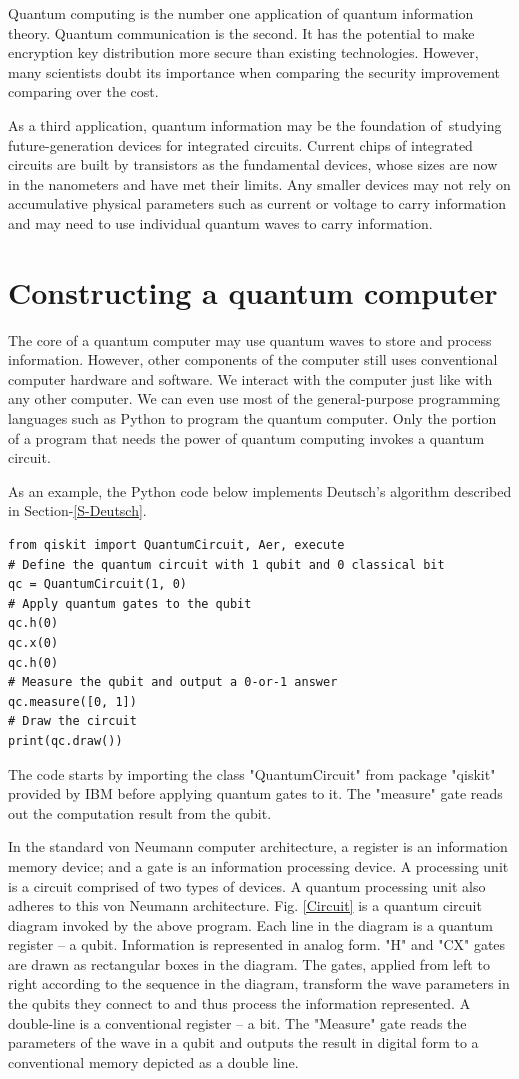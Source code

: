 \documentclass[oneside, letter, 12pt]{book}
\begin{document}
Quantum computing is the number one application of quantum information theory. Quantum communication is the second. It has the potential to make encryption key distribution more secure than existing technologies. However, many scientists doubt its importance when comparing the security improvement comparing over the cost.

As a third application, quantum information may be the foundation of studying future-generation devices for integrated circuits. Current chips of integrated circuits are built by transistors as the fundamental devices, whose sizes are now in the nanometers and have met their limits. Any smaller devices may not rely on accumulative physical parameters such as current or voltage to carry information and may need to use individual quantum waves to carry information.

\section{Constructing a quantum computer}
The core of a quantum computer may use quantum waves to store and process information. However, other components of the computer still uses conventional computer hardware and software. We interact with the computer just like with any other computer. We can even use most of the general-purpose programming languages such as Python to program the quantum computer. Only the portion of a program that needs the power of quantum computing invokes a quantum circuit.

As an example, the Python code below implements Deutsch's algorithm described in Section-\ref{S-Deutsch}.
\begin{lstlisting}
from qiskit import QuantumCircuit, Aer, execute
# Define the quantum circuit with 1 qubit and 0 classical bit
qc = QuantumCircuit(1, 0)
# Apply quantum gates to the qubit
qc.h(0)
qc.x(0)
qc.h(0)
# Measure the qubit and output a 0-or-1 answer
qc.measure([0, 1])
# Draw the circuit
print(qc.draw())
\end{lstlisting}
The code starts by importing the class "QuantumCircuit" from package "qiskit" provided by IBM before applying quantum gates to it. The "measure" gate reads out the computation result from the qubit. 

In the standard von Neumann computer architecture, a register is an information memory device; and a gate is an information processing device. A processing unit is a circuit comprised of two types of devices. A quantum processing unit also adheres to this von Neumann architecture. Fig. \ref{Circuit} is a quantum circuit diagram invoked by the above program. Each line in the diagram is a quantum register -- a qubit. Information is represented in analog form. "H" and "CX" gates are drawn as rectangular boxes in the diagram. The gates, applied from left to right according to the sequence in the diagram, transform the wave parameters in the qubits they connect to and thus process the information represented. A double-line is a conventional register -- a bit. The "Measure" gate reads the parameters of the wave in a qubit and outputs the result in digital form to a conventional memory depicted as a double line.
\end{document}
